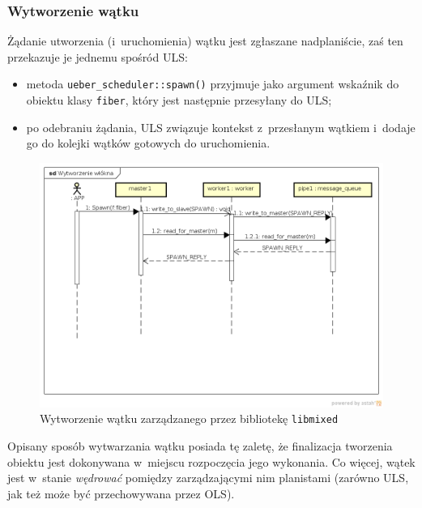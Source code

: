\documentclass[12pt]{mwart}
\newcommand{\code}{\texttt}
\newcommand{\dcolon}{::}
\newcommand{\procbr}{()}
\begin{document}
\subsubsection{Wytworzenie wątku}
\indent
	Żądanie utworzenia (i~uruchomienia) wątku jest zgłaszane nad\dywiz planiście, zaś ten przekazuje je jednemu spośród ULS:
	\begin{itemize}
		\item metoda \code{ueber\_scheduler\dcolon spawn\procbr} przyjmuje jako argument wskaźnik do obiektu klasy \code{fiber}, który
			jest następnie przesyłany do ULS;
		\item po odebraniu żądania, ULS związuje kontekst z~przesłanym wątkiem i~dodaje go do kolejki wątków gotowych do uruchomienia.
	\end{itemize}
	\begin{figure}[h!]
		\label{fig:threadcreation}
		\centering
		\hspace*{-1cm}\includegraphics[scale=.55]{ThreadCreation.png}
		\caption{Wytworzenie wątku zarządzanego przez bibliotekę \code{libmixed}}
	\end{figure}
	Opisany sposób wytwarzania wątku posiada tę zaletę, że finalizacja tworzenia obiektu jest dokonywana w~miejscu rozpoczęcia jego wykonania.
	Co więcej, wątek jest w~stanie \emph{wędrować} pomiędzy zarządzającymi nim planistami (zarówno ULS, jak też może być przechowywana przez
	OLS).
\par
%
\end{document}
